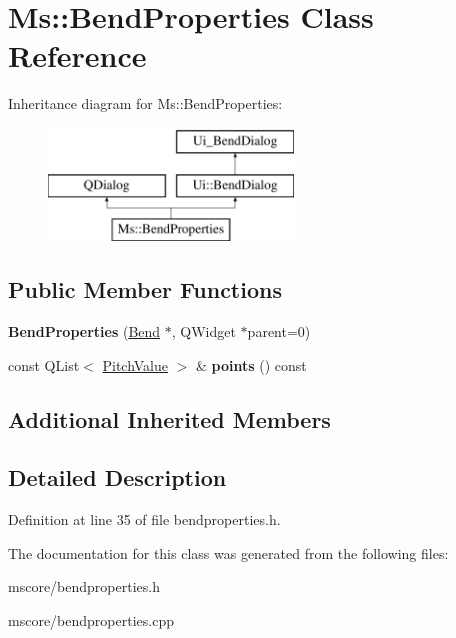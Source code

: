 \hypertarget{class_ms_1_1_bend_properties}{}\section{Ms\+:\+:Bend\+Properties Class Reference}
\label{class_ms_1_1_bend_properties}
Inheritance diagram for Ms\+:\+:Bend\+Properties\+:\begin{figure}[H]
\begin{center}
\leavevmode
\includegraphics[height=3.000000cm]{class_ms_1_1_bend_properties}
\end{center}
\end{figure}
\subsection*{Public Member Functions}
\begin{DoxyCompactItemize}
\item 
\mbox{\label{class_ms_1_1_bend_properties_a5fdd25fb8c09fc70fe13705639631fcc}} 
{\bfseries Bend\+Properties} (\hyperlink{class_ms_1_1_bend}{Bend} $\ast$, Q\+Widget $\ast$parent=0)
\item 
\mbox{\label{class_ms_1_1_bend_properties_a41c105d77f5241c44e02247116864ecd}} 
const Q\+List$<$ \hyperlink{struct_ms_1_1_pitch_value}{Pitch\+Value} $>$ \& {\bfseries points} () const
\end{DoxyCompactItemize}
\subsection*{Additional Inherited Members}


\subsection{Detailed Description}


Definition at line 35 of file bendproperties.\+h.



The documentation for this class was generated from the following files\+:\begin{DoxyCompactItemize}
\item 
mscore/bendproperties.\+h\item 
mscore/bendproperties.\+cpp\end{DoxyCompactItemize}
